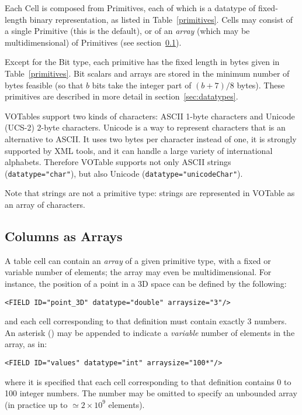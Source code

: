 \documentclass[11pt,a4paper]{ivoa}
\def\Aref#1{section~\ref{#1}}
\def\Tref#1{Table~\ref{#1}}
\let\fg=\color
\def\slash {{\fg{blue}/}}
\def\attrval#1#2{{\tt{\fg{DarkRed}#1}="{\fg{DarkPurple}#2}"}}
\def\elemdef#1#2{{\tt\fg{blue}<}{\tt{\fg{DarkRed}#1}#2}{\tt\fg{blue}>}}
\begin{document}
Each Cell is composed from Primitives, each of which is a datatype
of fixed-length binary representation, as listed in
\Tref{primitives}.
Cells may consist of a single Primitive (this is
the default), or of an {\em array} (which may be multidimensional)
of Primitives (see \Aref{array}).

Except for the Bit type, each primitive has the fixed length in
bytes given in \Tref{primitives}.
Bit scalars and arrays are stored in
the minimum number of bytes feasible (so that $b$ bits take the integer
part of $(b+7)/8$ bytes).  These primitives
are described in more detail in \Aref{sec:datatypes}.

VOTables support two kinds of characters: ASCII 1-byte characters
and Unicode (UCS-2) 2-byte characters. Unicode is a way to represent
characters that is an alternative to ASCII. It uses two bytes per
character instead of one, it is strongly supported by XML tools, and
it can handle a large variety of international alphabets. Therefore
VOTable supports not only ASCII strings ({\attrval{datatype}{char}}),
but also Unicode ({\attrval{datatype}{unicodeChar}}).

Note that strings are not a primitive type: strings are
represented in VOTable as an array of characters. %


\subsection{Columns as Arrays}\label{array}
\label{sec:dim}

A table cell can contain an {\em array} of a given primitive type,
with a fixed or variable number of elements; the array may even
be multidimensional. For instance, the position of a point in a
3D space can be defined by the following:

\elemdef{FIELD}{ \attrval{ID}{point\_3D} \attrval{datatype}{double}
   \attrval{arraysize}{3}\slash}

\noindent and each cell corresponding to that definition must contain exactly
3 numbers. An asterisk ({\bf\tt*}) may be appended to indicate
a {\em variable} number of elements in the array, as in:

\elemdef{FIELD}{ \attrval{ID}{values} \attrval{datatype}{int}
   \attrval{arraysize}{100*}\slash}

\noindent where it is specified that each cell corresponding to that
  definition contains 0 to 100 integer numbers. The number may be
  omitted to specify an unbounded array
  (in practice up to $\simeq 2\times10^9$ elements).
\end{document}
